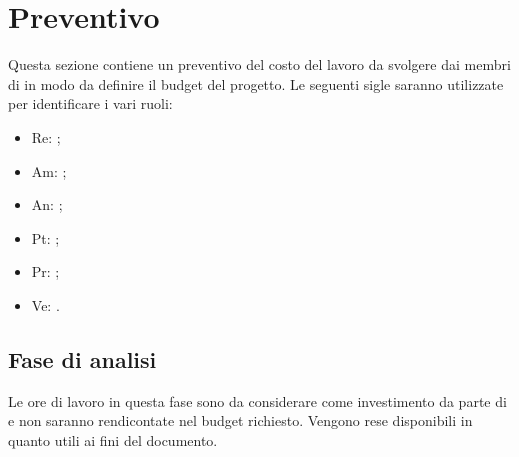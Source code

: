 \section{Preventivo}
Questa sezione contiene un preventivo del costo del lavoro da svolgere dai membri di \groupName{} in modo da definire il budget del progetto. \newline
Le seguenti sigle saranno utilizzate per identificare i vari ruoli:
    \begin{itemize}
        \item Re: \roleProjectManager;
        \item Am: \roleAdministrator;
        \item An: \roleAnalyst;
        \item Pt: \roleDesigner;
        \item Pr: \roleProgrammer;
        \item Ve: \roleVerifier.
    \end{itemize}

    \subsection{Fase di analisi}
    Le ore di lavoro in questa fase sono da considerare come investimento da parte di \groupName{} e non saranno rendicontate nel budget richiesto.
    Vengono rese disponibili in quanto utili ai fini del documento. 
